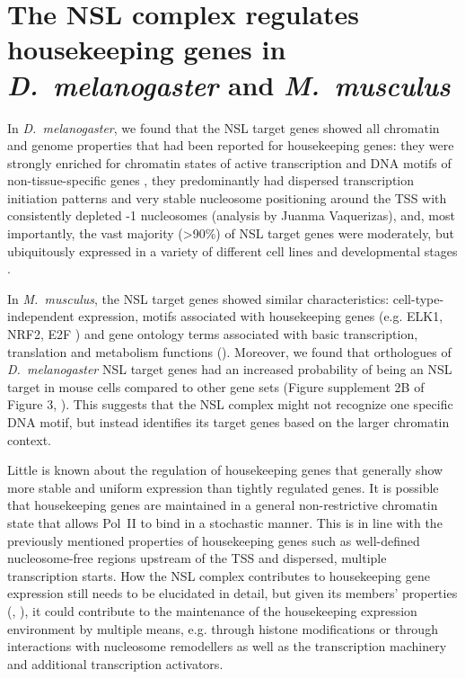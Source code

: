 \section{The NSL complex regulates housekeeping genes in\\\textit{D.~melano\-gaster} and \textit{M.~musculus}}
In \textit{D.~melano\-gaster}, we found that the NSL target genes showed all chromatin and genome properties that had been reported for housekeeping genes: they were strongly enriched for chromatin states of active transcription \citep{Filion2010,Kharchenko2011} and DNA motifs of non-tissue-specific genes \citep{Ohler2002a}, they predominantly had dispersed transcription initiation patterns \citep{Hoskins2011} and very stable nucleosome positioning around the TSS with consistently depleted -1 nucleosomes (analysis by Juanma Vaquerizas), and, most importantly, the vast majority (\textgreater 90\%) of NSL target genes were moderately, but ubiquitously expressed in a variety of different cell lines and developmental stages \citep{Cherbas2011, Graveley2011}.

In \textit{M.~musculus}, the NSL target genes showed similar characteristics: cell-type-in\-de\-pen\-dent expression, motifs associated with housekeeping genes (e.g. ELK1, NRF2, E2F \citep{Xie2005}) and gene ontology terms associated with basic transcription, translation and metabolism functions (). Moreover, we found that orthologues of \textit{D.~melano\-gaster} NSL target genes had an increased probability of being an NSL target in mouse cells compared to other gene sets (Figure supplement 2B of Figure 3, ). This suggests that the NSL complex might not recognize one specific DNA motif, but instead identifies its target genes based on the larger chromatin context.

Little is known about the regulation of housekeeping genes that generally show more stable and uniform expression than tightly regulated genes. It is possible that housekeeping genes are maintained in a general non-restrictive chromatin state that allows Pol~II to bind in a stochastic manner. This is in line with the previously mentioned properties of housekeeping genes such as well-defined nucleosome-free regions upstream of the TSS and dispersed, multiple transcription starts. How the NSL complex contributes to housekeeping gene expression still needs to be elucidated in detail, but given its members’ properties (, ), it could contribute to the maintenance of the housekeeping expression environment by multiple means, e.g. through histone modifications or through interactions with nucleosome remodellers as well as the transcription machinery and additional transcription activators.

